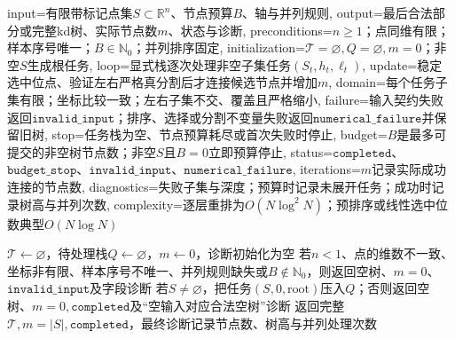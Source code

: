 \begin{AlgorithmContract}{
  input={有限带标记点集$S\subset\mathbb R^n$、节点预算$B$、轴与并列规则},
  output={最后合法部分或完整kd树、实际节点数$m$、状态与诊断},
  preconditions={$n\ge1$；点同维有限；样本序号唯一；$B\in\mathbb N_0$；并列排序固定},
  initialization={$\mathcal T=\varnothing,Q=\varnothing,m=0$；非空$S$生成根任务},
  loop={显式栈逐次处理非空子集任务$(S_t,h_t,\ell_t)$},
  update={稳定选中位点、验证左右严格真分割后才连接候选节点并增加$m$},
  domain={每个任务子集有限；坐标比较一致；左右子集不交、覆盖且严格缩小},
  failure={输入契约失败返回$\mathtt{invalid\_input}$；排序、选择或分割不变量失败返回$\mathtt{numerical\_failure}$并保留旧树},
  stop={任务栈为空、节点预算耗尽或首次失败时停止},
  budget={$B$是最多可提交的非空树节点数；非空$S$且$B=0$立即预算停止},
  status={$\mathtt{completed}$、$\mathtt{budget\_stop}$、$\mathtt{invalid\_input}$、$\mathtt{numerical\_failure}$},
  iterations={$m$记录实际成功连接的节点数},
  diagnostics={失败子集与深度；预算时记录未展开任务；成功时记录树高与并列次数},
  complexity={逐层重排为$O(N\log^2N)$；预排序或线性选中位数典型$O(N\log N)$}
}
\begin{algorithm}[H]
\caption{按坐标循环构造平衡kd树}\label{alg:V2-C02-kd-build}
$\mathcal T\leftarrow\varnothing$，待处理栈$Q\leftarrow\varnothing$，$m\leftarrow0$，诊断初始化为空\;
若$n<1$、点的维数不一致、坐标非有限、样本序号不唯一、并列规则缺失或$B\notin\mathbb N_0$，则返回空树、$m=0$、$\mathtt{invalid\_input}$及字段诊断\;
若$S\ne\varnothing$，把任务$(S,0,\mathrm{root})$压入$Q$；否则返回空树、$m=0,\mathtt{completed}$及“空输入对应合法空树”诊断\;
返回完整$\mathcal T,m=|S|,\mathtt{completed}$，最终诊断记录节点数、树高与并列处理次数\;
\end{algorithm}
\end{AlgorithmContract}

